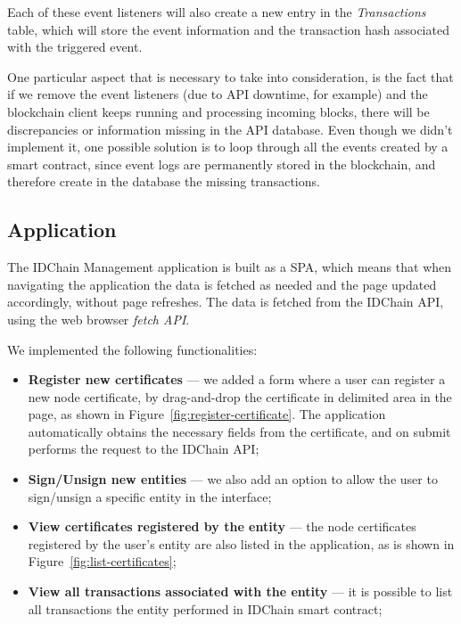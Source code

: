 Each of these event listeners will also create a new entry in the \textit{Transactions} table, which will store the event information and the transaction hash associated with the triggered event.

One particular aspect that is necessary to take into consideration, is the fact that if we remove the event listeners (due to API downtime, for example) and the blockchain client keeps running and processing incoming blocks, there will be discrepancies or information missing in the API database.
Even though we didn't implement it, one possible solution is to loop through all the events created by a smart contract, since event logs are permanently stored in the blockchain, and therefore create in the database the missing transactions.

\subsection{Application}\label{subsection:mapp}

The IDChain Management application is built as a \ac{SPA}, which means that when navigating the application the data is fetched as needed and the page updated accordingly, without page refreshes.
The data is fetched from the IDChain API, using the web browser \textit{fetch API}.

We implemented the following functionalities:
\begin{itemize}
  \item \textbf{Register new certificates} — we added a form where a user can register a new node certificate, by drag-and-drop the certificate in delimited area in the page, as shown in Figure~\ref{fig:register-certificate}. The application automatically obtains the necessary fields from the certificate, and on submit performs the request to the IDChain API;
  \item \textbf{Sign/Unsign new entities} — we also add an option to allow the user to sign/unsign a specific entity in the interface;
  \item \textbf{View certificates registered by the entity} — the node certificates registered by the user's entity are also listed in the application, as is shown in Figure~\ref{fig:list-certificates};
  \item \textbf{View all transactions associated with the entity} — it is possible to list all transactions the entity performed in IDChain smart contract;
\end{itemize}

